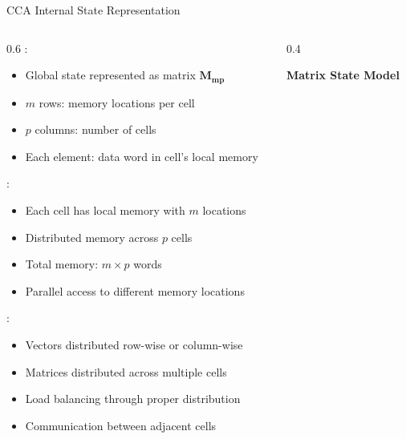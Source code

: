 \begin{frame}{CCA Internal State Representation}
\begin{columns}
\begin{column}{0.6\textwidth}
:
\begin{itemize}
\item Global state represented as matrix $\mathbf{M_{mp}}$
\item $m$ rows: memory locations per cell
\item $p$ columns: number of cells
\item Each element: data word in cell's local memory
\end{itemize}

\vspace{0.3cm}
:
\begin{itemize}
\item Each cell has local memory with $m$ locations
\item Distributed memory across $p$ cells
\item Total memory: $m \times p$ words
\item Parallel access to different memory locations
\end{itemize}

\vspace{0.3cm}
:
\begin{itemize}
\item Vectors distributed row-wise or column-wise
\item Matrices distributed across multiple cells
\item Load balancing through proper distribution
\item Communication between adjacent cells
\end{itemize}
\end{column}
\begin{column}{0.4\textwidth}
\begin{center}
\textbf{Matrix State Model}
\vspace{0.3cm}

\end{center}
\end{column}
\end{columns}
\end{frame}

